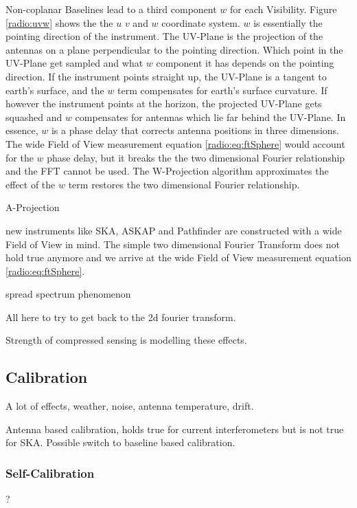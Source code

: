 Non-coplanar Baselines lead to a third component $w$ for each Visibility. Figure \ref{radio:uvw} shows the the $u$ $v$ and $w$ coordinate system. $w$ is essentially the pointing direction of the instrument. The UV-Plane is the projection of the antennas on a plane perpendicular to the pointing direction. Which point in the UV-Plane get sampled and what $w$ component it has depends on the pointing direction. If the instrument points straight up, the UV-Plane is a tangent to earth's surface, and the $w$ term compensates for earth's surface curvature. If however the instrument points at the horizon, the projected UV-Plane gets squashed and $w$ compensates for antennas which lie far behind the UV-Plane. In essence, $w$ is a phase delay that corrects antenna positions in three dimensions. The wide Field of View measurement equation \eqref{radio:eq:ftSphere} would account for the $w$ phase delay, but it breaks the the two dimensional Fourier relationship and the FFT cannot be used. The W-Projection \cite{cornwell2008noncoplanar} algorithm approximates the effect of the $w$ term restores the two dimensional Fourier relationship.

A-Projection \cite{tasse2013applying}


new instruments like SKA, ASKAP and Pathfinder are constructed with a wide Field of View in mind. The simple two dimensional Fourier Transform does not hold true anymore and we arrive at the wide Field of View measurement equation \eqref{radio:eq:ftSphere}.

spread spectrum phenomenon

All here to try to get back to the 2d fourier transform. 





Strength of compressed sensing is modelling these effects.

\subsection{Calibration}
A lot of effects, weather, noise, antenna temperature, drift.

Antenna based calibration, holds true for current interferometers but is not true for SKA. Possible switch to baseline based calibration.

\subsubsection{Self-Calibration}
?